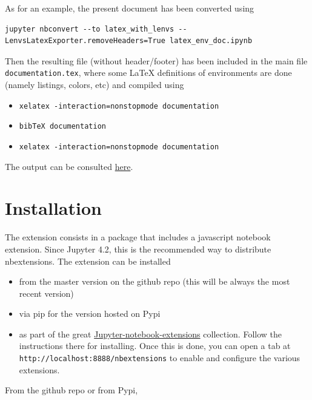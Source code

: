     \begin{example} As for an example, the present document has
been converted using

\begin{verbatim}
jupyter nbconvert --to latex_with_lenvs --LenvsLatexExporter.removeHeaders=True latex_env_doc.ipynb
\end{verbatim}

Then the resulting file (without header/footer) has been included in the
main file \texttt{documentation.tex}, where some LaTeX definitions of
environments are done (namely listings, colors, etc) and compiled using

\begin{itemize}
\tightlist
\item
  \texttt{xelatex\ -interaction=nonstopmode\ documentation}
\item
  \texttt{bibTeX\ documentation}
\item
  \texttt{xelatex\ -interaction=nonstopmode\ documentation}
\end{itemize}

The output can be consulted \href{documentation.pdf}{here}.\\
\end{example}

    \section{Installation}\label{installation}

    The extension consists in a package that includes a javascript notebook
extension. Since Jupyter 4.2, this is the recommended way to distribute
nbextensions. The extension can be installed

\begin{itemize}
\tightlist
\item
  from the master version on the github repo (this will be always the
  most recent version)
\item
  via pip for the version hosted on Pypi
\item
  as part of the great
  \href{https://github.com/ipython-contrib/Jupyter-notebook-extensions}{Jupyter-notebook-extensions}
  collection. Follow the instructions there for installing. Once this is
  done, you can open a tab at
  \texttt{http://localhost:8888/nbextensions} to enable and configure
  the various extensions.
\end{itemize}

From the github repo or from Pypi,

